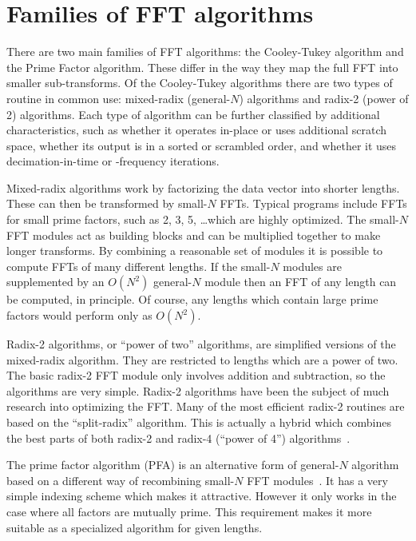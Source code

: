 \documentclass[fleqn,12pt]{article}
\begin{document}
\section{Families of FFT algorithms}
%
There are two main families of FFT algorithms: the Cooley-Tukey
algorithm and the Prime Factor algorithm. These differ in the way they
map the full FFT into smaller sub-transforms. Of the Cooley-Tukey
algorithms there are two types of routine in common use: mixed-radix
(general-$N$) algorithms and radix-2 (power of 2) algorithms. Each
type of algorithm can be further classified by additional characteristics,
such as whether it operates in-place or uses additional scratch space,
whether its output is in a sorted or scrambled order, and whether it
uses decimation-in-time or -frequency iterations.

Mixed-radix algorithms work by factorizing the data vector into
shorter lengths. These can then be transformed by small-$N$ FFTs.
Typical programs include FFTs for small prime factors, such as 2, 3,
5, \dots which are highly optimized. The small-$N$ FFT modules act as
building blocks and can be multiplied together to make longer
transforms. By combining a reasonable set of modules it is possible to
compute FFTs of many different lengths. If the small-$N$ modules are
supplemented by an $O(N^2)$ general-$N$ module then an FFT of any
length can be computed, in principle. Of course, any lengths which
contain large prime factors would perform only as $O(N^2)$.

Radix-2 algorithms, or ``power of two'' algorithms, are simplified
versions of the mixed-radix algorithm. They are restricted to lengths
which are a power of two. The basic radix-2 FFT module only involves
addition and subtraction, so the algorithms are very simple. Radix-2
algorithms have been the subject of much research into optimizing the
FFT. Many of the most efficient radix-2 routines are based on the
``split-radix'' algorithm. This is actually a hybrid which combines
the best parts of both radix-2 and radix-4 (``power of 4'')
algorithms~\cite{sorenson86,duhamel86}.

The prime factor algorithm (PFA) is an alternative form of general-$N$
algorithm based on a different way of recombining small-$N$ FFT
modules~\cite{temperton83pfa,temperton85}. It has a very simple indexing
scheme which makes it attractive. However it only works in the case
where all factors are mutually prime. This requirement makes it more
suitable as a specialized algorithm for given lengths.
\end{document}
